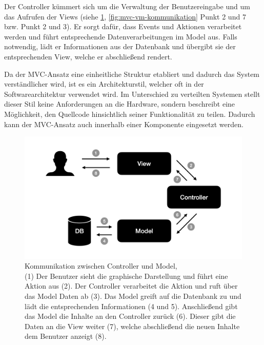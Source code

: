 Der Controller kümmert sich um die Verwaltung der Benutzereingabe und um das Aufrufen der Views (siehe \cref{fig:mvc-cm-kommunikation}, \cref{fig:mvc-vm-kommunikation} Punkt 2 und 7 bzw. Punkt 2 und 3). Er sorgt dafür, dass Events und Aktionen verarbeitet werden und führt entsprechende Datenverarbeitungen im Model aus. Falls notwendig, lädt er Informationen aus der Datenbank und übergibt sie der entsprechenden View, welche er abschließend rendert.

Da der MVC-Ansatz eine einheitliche Struktur etabliert und dadurch das System verständlicher wird, ist es ein Architekturstil, welcher oft in der Softwarearchitektur verwendet wird. Im Unterschied zu verteilten Systemen stellt dieser Stil keine Anforderungen an die Hardware, sondern beschreibt eine Möglichkeit, den Quellcode hinsichtlich seiner Funktionalität zu teilen. Dadurch kann der MVC-Ansatz auch innerhalb einer Komponente eingesetzt werden.

\begin{figure}
	\centering
	\includegraphics[width=.6\textwidth]{Assets/Interaktionsorientiert.001}
	\caption[Kommunikation zwischen Controller und Model]{Kommunikation zwischen Controller und Model, \\ (1) Der Benutzer sieht die graphische Darstellung und führt eine Aktion aus (2). Der Controller verarbeitet die Aktion und ruft über das Model Daten ab (3). Das Model greift auf die Datenbank zu und lädt die entsprechenden Informationen (4 und 5). Anschließend gibt das Model die Inhalte an den Controller zurück (6). Dieser gibt die Daten an die View weiter (7), welche abschließend die neuen Inhalte dem Benutzer anzeigt (8).}
	\label{fig:mvc-cm-kommunikation}
 \end{figure}
 
